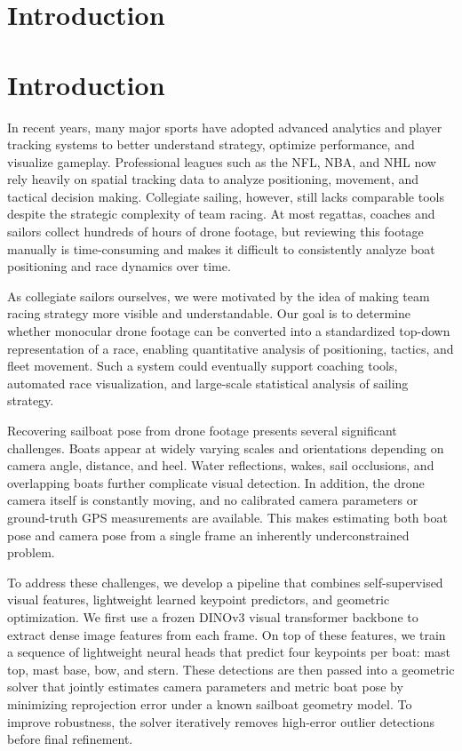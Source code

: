 \section{Introduction}

\section{Introduction}

In recent years, many major sports have adopted advanced analytics and player tracking systems to better understand strategy, optimize performance, and visualize gameplay. Professional leagues such as the NFL, NBA, and NHL now rely heavily on spatial tracking data to analyze positioning, movement, and tactical decision making. Collegiate sailing, however, still lacks comparable tools despite the strategic complexity of team racing. At most regattas, coaches and sailors collect hundreds of hours of drone footage, but reviewing this footage manually is time-consuming and makes it difficult to consistently analyze boat positioning and race dynamics over time.

As collegiate sailors ourselves, we were motivated by the idea of making team racing strategy more visible and understandable. Our goal is to determine whether monocular drone footage can be converted into a standardized top-down representation of a race, enabling quantitative analysis of positioning, tactics, and fleet movement. Such a system could eventually support coaching tools, automated race visualization, and large-scale statistical analysis of sailing strategy.

Recovering sailboat pose from drone footage presents several significant challenges. Boats appear at widely varying scales and orientations depending on camera angle, distance, and heel. Water reflections, wakes, sail occlusions, and overlapping boats further complicate visual detection. In addition, the drone camera itself is constantly moving, and no calibrated camera parameters or ground-truth GPS measurements are available. This makes estimating both boat pose and camera pose from a single frame an inherently underconstrained problem.

To address these challenges, we develop a pipeline that combines self-supervised visual features, lightweight learned keypoint predictors, and geometric optimization. We first use a frozen DINOv3 visual transformer backbone to extract dense image features from each frame. On top of these features, we train a sequence of lightweight neural heads that predict four keypoints per boat: mast top, mast base, bow, and stern. These detections are then passed into a geometric solver that jointly estimates camera parameters and metric boat pose by minimizing reprojection error under a known sailboat geometry model. To improve robustness, the solver iteratively removes high-error outlier detections before final refinement.

